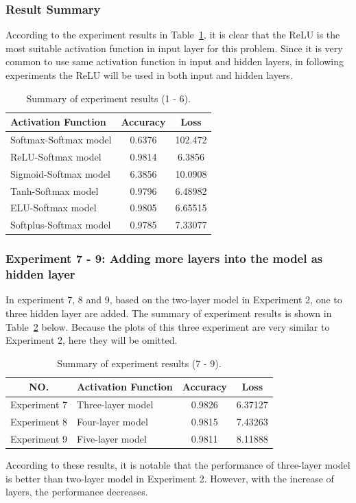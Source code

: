 \documentclass[]{UCD_CS_FYP_Report}
\begin{document}
\subsubsection{Result Summary}
According to the experiment results in Table~\ref{tab:table_1}, it is clear that the ReLU is the most suitable activation function in input layer for this problem. Since it is very common to use same activation function in input and hidden layers, in following experiments the ReLU will be used in both input and hidden layers.
\begin{table}[h!]
  \begin{center}
    \caption{Summary of experiment results (1 - 6).}
    \label{tab:table_1}
    \begin{tabular}{l|c|c}
      \textbf{Activation Function} & \textbf{Accuracy} & \textbf{Loss}\\
      \hline
      Softmax-Softmax model & 0.6376 & 102.472\\
      ReLU-Softmax model & 0.9814 & 6.3856\\
      Sigmoid-Softmax model & 6.3856 & 10.0908\\
      Tanh-Softmax model & 0.9796 & 6.48982\\
      ELU-Softmax model & 0.9805 & 6.65515\\
      Softplus-Softmax model & 0.9785 & 7.33077\\
    \end{tabular}
  \end{center}
\end{table}
%
\subsubsection{Experiment 7 - 9: Adding more layers into the model as hidden layer}
In experiment 7, 8 and 9, based on the two-layer model in Experiment 2, one to three hidden layer are added. The summary of experiment results is shown in Table~\ref{tab:table_2} below. Because the plots of this three experiment are very similar to Experiment 2, here they will be omitted.
\begin{table}[h!]
  \begin{center}
    \caption{Summary of experiment results (7 - 9).}
    \label{tab:table_2}
    \begin{tabular}{c|l|c|c}
      \textbf{NO.} &\textbf{Activation Function} & \textbf{Accuracy} & \textbf{Loss}\\
      \hline
      Experiment 7 & Three-layer model & 0.9826 & 6.37127\\
      Experiment 8 & Four-layer model & 0.9815 & 7.43263\\
      Experiment 9 & Five-layer model & 0.9811 & 8.11888\\
    \end{tabular}
  \end{center}
\end{table}
According to these results, it is notable that the performance of three-layer model is better than two-layer model in Experiment 2. However, with the increase of layers, the performance decreases. 
\end{document}
